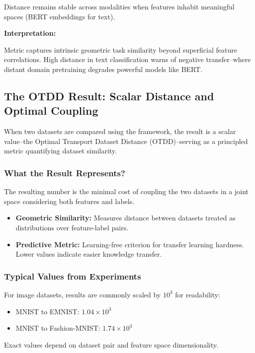 \documentclass[11pt, a4paper]{article}
\theoremstyle{plain} %
\theoremstyle{definition} %
\begin{document}
				Distance remains stable across modalities when features inhabit meaningful spaces (BERT embeddings for text).

				\textbf{Interpretation:}

				Metric captures intrinsic geometric task similarity beyond superficial feature correlations. High distance in text classification warns of negative transfer--where distant domain pretraining degrades powerful models like BERT.


		\subsection{The OTDD Result: Scalar Distance and Optimal Coupling}
		\label{sec:otdd_result}
			When two datasets are compared using the framework, the result is a scalar value--the Optimal Transport Dataset Distance (OTDD)--serving as a principled metric quantifying dataset similarity.

			\subsubsection{What the Result Represents?}
			\label{sec:representation}
				The resulting number is the minimal cost of coupling the two datasets in a joint space considering both features and labels.
				\begin{itemize}
					\item \textbf{Geometric Similarity:} Measures distance between datasets treated as distributions over feature-label pairs.
					\item \textbf{Predictive Metric:} Learning-free criterion for transfer learning hardness. Lower values indicate easier knowledge transfer.
				\end{itemize}
	
			\subsubsection{Typical Values from Experiments}
			\label{sec:values_from_experiment}
				For image datasets, results are commonly scaled by $10^3$ for readability:
				\begin{itemize}
					\item MNIST to EMNIST: $1.04 \times 10^3$
					\item MNIST to Fashion-MNIST: $1.74 \times 10^3$
				\end{itemize}
				Exact values depend on dataset pair and feature space dimensionality.
\end{document}
